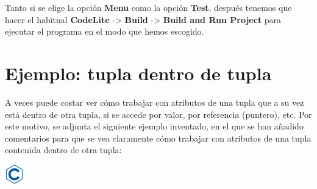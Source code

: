 \documentclass[
]{book}
\begin{document}
Tanto si se elige la opción \textbf{Menu} como la opción \textbf{Test}, después tenemos que hacer el habitual \textbf{CodeLite} -\textgreater{} \textbf{Build} -\textgreater{} \textbf{Build and Run Project} para ejecutar el programa en el modo que hemos escogido.

\hypertarget{ejemplo-tupla-dentro-de-tupla}{%
\section{Ejemplo: tupla dentro de tupla}\label{ejemplo-tupla-dentro-de-tupla}}

A veces puede costar ver cómo trabajar con atributos de una tupla que a su vez está dentro de otra tupla, si se accede por valor, por referencia (puntero), etc. Por este motivo, se adjunta el siguiente ejemplo inventado, en el que se han añadido comentarios para que se vea claramente cómo trabajar con atributos de una tupla contenida dentro de otra tupla:

\includegraphics{./img/c.png}
\end{document}
